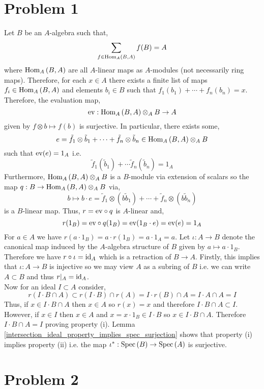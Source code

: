 \documentclass[12pt]{extarticle}
\begin{document}
 
\section*{Problem 1}

Let $B$ be an $A$-algebra such that,
\[ \sum_{f \in \mathrm{Hom}_{A} \left( B, A \right)} f(B) = A \]
where $\mathrm{Hom}_{A} \left( B, A \right)$ are all $A$-linear maps as $A$-modules (not necessarily ring maps). Therefore, for each $x \in A$ there exists a finite list of maps $f_i \in \mathrm{Hom}_{A} \left( B, A \right)$ and elements $b_i \in B$ such that $f_1(b_1) + \cdots + f_n(b_n) = x$. Therefore, the evaluation map,
\[ \mathrm{ev} : \mathrm{Hom}_{A} \left( B, A \right) \otimes_A B \to A \]
given by $f \otimes b \mapsto f(b)$ is surjective. In particular, there exists some,
\[ e = \tilde{f}_1 \otimes \tilde{b}_1 + \cdots + \tilde{f}_n \otimes \tilde{b}_n \in \mathrm{Hom}_{A} \left( B, A \right) \otimes_A B \]
such that $\mathrm{ev}(e) = 1_A$ i.e.
\[ \tilde{f}_1(\tilde{b}_1) + \cdots \tilde{f}_n(\tilde{b}_n) = 1_A \]
Furthermore, $\mathrm{Hom}_{A} \left( B, A \right) \otimes_A B$ is a $B$-module via extension of scalars so the map $q : B \to \mathrm{Hom}_{A} \left( B, A \right) \otimes_A B$ via, 
\[ b \mapsto b \cdot e = \tilde{f}_1 \otimes (b \tilde{b}_1) + \cdots + \tilde{f}_n \otimes (b \tilde{b}_n) \]
is a $B$-linear map. Thus, $r = \mathrm{ev} \circ q$ is $A$-linear and,
\[ r(1_B) = \mathrm{ev} \circ q(1_B) = \mathrm{ev}(1_B \cdot e) = \mathrm{ev}(e) = 1_A\]
For $a \in A$ we have $r(a \cdot 1_B) = a \cdot r(1_B) = a \cdot 1_A = a$. Let $\iota : A \to B$ denote the canonical map induced by the $A$-algebra structure of $B$ given by $a \mapsto a \cdot 1_B$. Therefore we have $r \circ \iota = \mathrm{id}_A$ which is a retraction of $B \to A$. Firstly, this implies that $\iota : A \to B$ is injective so we may view $A$ as a subring of $B$ i.e. we can write $A \subset B$ and thus $r|_A = \mathrm{id}_A$. 
\bigskip\\
Now for an ideal $I \subset A$ consider,
\[ r(I \cdot B \cap A) \subset r(I \cdot B) \cap r(A) = I \cdot r(B) \cap A = I \cdot A \cap A = I \]
Thus, if $x \in I \cdot B \cap A$ then $x \in A$ so $r(x) = x$ and therefore $I \cdot B \cap A \subset I$. However, if $x \in I$ then $x \in A$ and $x = x \cdot 1_B \in I \cdot B$ so $x \in I \cdot B \cap A$. Therefore $I \cdot B \cap A = I$ proving property (i). Lemma \ref{intersection_ideal_property_implies_spec_surjection} shows that property (i) implies property (ii) i.e. the map $\iota^* : \mathrm{Spec}\left( B \right) \to \mathrm{Spec}\left( A \right)$ is surjective. 

\section*{Problem 2}
\end{document}
